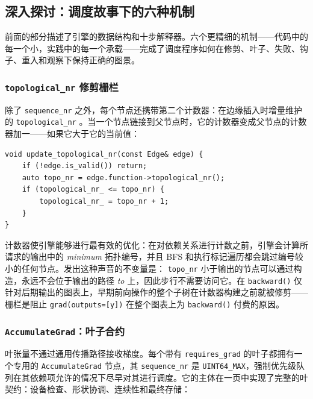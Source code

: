 \subsection{深入探讨：调度故事下的六种机制}
\label{subsec:autograd-deep}

前面的部分描述了引擎的数据结构和十步解释器。六个更精细的机制——代码中的每一个小，实践中的每一个承载——完成了调度程序如何在修剪、叶子、失败、钩子、重入和观察下保持正确的图景。

\subsubsection{\texttt{topological\_nr} 修剪栅栏}
\label{subsubsec:topoprune}

除了 \texttt{sequence\_nr} 之外，每个节点还携带第二个计数器：在边缘插入时增量维护的 \texttt{topological\_nr} 。当一个节点链接到父节点时，它的计数器变成父节点的计数器加一——如果它大于它的当前值：

\begin{lstlisting}[caption={Topological number maintenance is two lines at graph-construction time---no pass over the graph is ever needed later.}]
void update_topological_nr(const Edge& edge) {
    if (!edge.is_valid()) return;
    auto topo_nr = edge.function->topological_nr();
    if (topological_nr_ <= topo_nr) {
        topological_nr_ = topo_nr + 1;
    }
}
\end{lstlisting}

计数器使引擎能够进行最有效的优化：在对依赖关系进行计数之前，引擎会计算所请求的输出中的 \emph{minimum} 拓扑编号，并且 BFS 和执行标记遍历都会跳过编号较小的任何节点。发出这种声音的不变量是： \texttt{topo\_nr} 小于输出的节点可以通过构造，永远不会位于输出的路径 \emph{to} 上，因此步行不需要访问它。在 \texttt{backward()} 仅针对后期输出的图表上，早期前向操作的整个子树在计数器构建之前就被修剪——栅栏是阻止 \texttt{grad(outputs=[y])} 在整个图表上为 \texttt{backward()} 付费的原因。

\subsubsection{\texttt{AccumulateGrad}：叶子合约}
\label{subsubsec:accumulategrad}

叶张量不通过通用传播路径接收梯度。每个带有 \texttt{requires\_grad} 的叶子都拥有一个专用的 \texttt{AccumulateGrad} 节点，其 \texttt{sequence\_nr} 是 \texttt{UINT64\_MAX}，强制优先级队列在其依赖项允许的情况下尽早对其进行调度。它的主体在一页中实现了完整的叶契约：设备检查、形状协调、连续性和最终存储：


